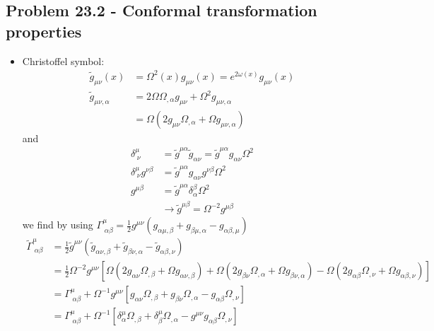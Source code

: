 \documentclass[../main.tex]{subfiles}
\begin{document}
\subsection{Problem 23.2 - Conformal transformation properties}
\begin{itemize}
\item Christoffel symbol:
\begin{align}
    \tilde{g}_{\mu\nu}(x)&=\Omega^2(x)g_{\mu\nu}(x)=e^{2\omega(x)}g_{\mu\nu}(x)\\
    \tilde{g}_{\mu\nu,\alpha}
    &=2\Omega\Omega_{,\alpha}g_{\mu\nu}+\Omega^2g_{\mu\nu,\alpha}\\
    &=\Omega(2g_{\mu\nu}\Omega_{,\alpha}+\Omega g_{\mu\nu,\alpha})
\end{align}
and
\begin{align}
\delta^\mu_{\;\nu}&=\tilde{g}^{\mu\alpha}\tilde{g}_{\alpha\nu}=\tilde{g}^{\mu\alpha}g_{\alpha\nu}\Omega^2\\
\delta^\mu_{\;\nu}g^{\nu\beta}&=\tilde{g}^{\mu\alpha}g_{\alpha\nu}g^{\nu\beta}\Omega^2\\
g^{\mu\beta}&=\tilde{g}^{\mu\alpha}\delta^\beta_\alpha\Omega^2\\
&\rightarrow\tilde{g}^{\mu\beta}=\Omega^{-2}g^{\mu\beta}
\end{align}
we find by using $\Gamma^\mu_{\;\alpha\beta}=\frac{1}{2}g^{\mu\nu}\left(g_{\alpha\mu,\beta}+g_{\beta\mu,\alpha}-g_{\alpha\beta,\mu}\right)$
\begin{align}
\tilde\Gamma^\mu_{\;\alpha\beta}
&=\frac{1}{2}\tilde{g}^{\mu\nu}\left(\tilde{g}_{\alpha\nu,\beta}+\tilde{g}_{\beta\nu,\alpha}-\tilde{g}_{\alpha\beta,\nu}\right)\\
&=\frac{1}{2}\Omega^{-2}g^{\mu\nu}\left[
 \Omega(2g_{\alpha\nu}\Omega_{,\beta}+\Omega g_{\alpha\nu,\beta})
+\Omega(2g_{\beta\nu}\Omega_{,\alpha}+\Omega g_{\beta\nu,\alpha})
-\Omega(2g_{\alpha\beta}\Omega_{,\nu}+\Omega g_{\alpha\beta,\nu})
\right]\\
&=\Gamma^\mu_{\;\alpha\beta}+\Omega^{-1}g^{\mu\nu}\left[
 g_{\alpha\nu}\Omega_{,\beta}
+g_{\beta\nu}\Omega_{,\alpha}
-g_{\alpha\beta}\Omega_{,\nu}
\right]\\
&=\Gamma^\mu_{\;\alpha\beta}+\Omega^{-1}\left[
 \delta^\mu_\alpha\Omega_{,\beta}
+\delta_\beta^\mu\Omega_{,\alpha}
-g^{\mu\nu}g_{\alpha\beta}\Omega_{,\nu}
\right]
\end{align}


\end{itemize}
\end{document}
